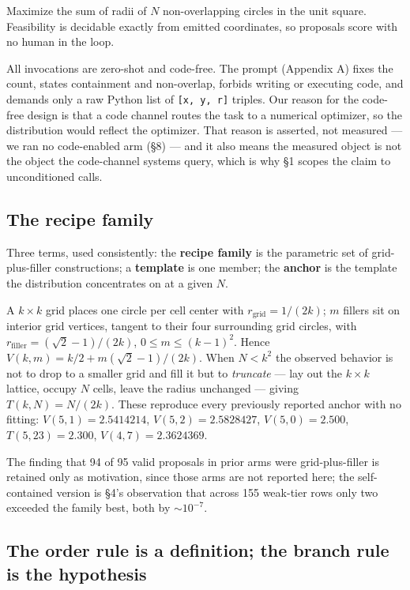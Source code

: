 \documentclass[11pt]{article}
\begin{document}
Maximize the sum of radii of $N$ non-overlapping circles in the unit square. Feasibility is
decidable exactly from emitted coordinates, so proposals score with no human in the loop.

All invocations are zero-shot and code-free. The prompt (Appendix A) fixes the count, states
containment and non-overlap, forbids writing or executing code, and demands only a raw Python
list of \texttt{[x, y, r]} triples. Our reason for the code-free design is that a code channel routes
the task to a numerical optimizer, so the distribution would reflect the optimizer. That reason
is asserted, not measured --- we ran no code-enabled arm (\S8) --- and it also means the measured
object is not the object the code-channel systems query, which is why \S1 scopes the claim to
unconditioned calls.

\subsection{The recipe family}

Three terms, used consistently: the \textbf{recipe family} is the parametric set of grid-plus-filler
constructions; a \textbf{template} is one member; the \textbf{anchor} is the template the distribution
concentrates on at a given $N$.

A $k \times k$ grid places one circle per cell center with $r_{\mathrm{grid}} = 1/(2k)$; $m$ fillers sit on interior
grid vertices, tangent to their four surrounding grid circles, with $r_{\mathrm{filler}} = (\sqrt{2} - 1)/(2k)$,
$0 \le m \le (k-1)^2$. Hence $V(k, m) = k/2 + m(\sqrt{2} - 1)/(2k)$. When $N < k^2$ the observed behavior is not
to drop to a smaller grid and fill it but to \textit{truncate} --- lay out the $k \times k$ lattice, occupy $N$
cells, leave the radius unchanged --- giving $T(k, N) = N/(2k)$. These reproduce every previously
reported anchor with no fitting: $V(5,1) = 2.5414214$, $V(5,2) = 2.5828427$, $V(5,0) = 2.500$,
$T(5,23) = 2.300$, $V(4,7) = 2.3624369$.

The finding that 94 of 95 valid proposals in prior arms were grid-plus-filler is retained only as
motivation, since those arms are not reported here; the self-contained version is \S4's
observation that across 155 weak-tier rows only two exceeded the family best, both by ${\sim}10^{-7}$.

\subsection{The order rule is a definition; the branch rule is the hypothesis}
\end{document}
